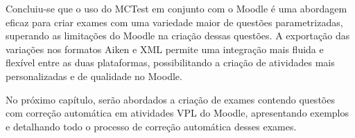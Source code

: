 Concluiu-se que o uso do MCTest em conjunto com o Moodle é uma abordagem eficaz para criar exames com uma variedade maior de questões parametrizadas, superando as limitações do Moodle na criação dessas questões. A exportação das variações nos formatos Aiken e XML permite uma integração mais fluida e flexível entre as duas plataformas, possibilitando a criação de atividades mais personalizadas e de qualidade no Moodle.

No próximo capítulo, serão abordados a criação de exames contendo questões com correção automática em atividades VPL do Moodle, apresentando exemplos e detalhando todo o processo de correção automática desses exames.